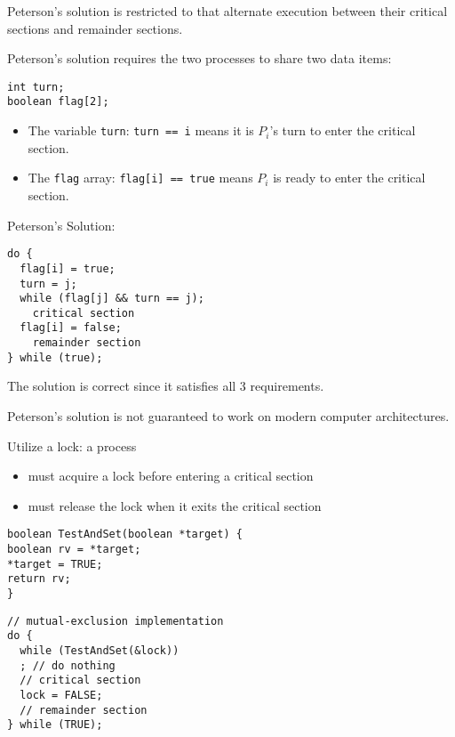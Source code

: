   \par Peterson's solution is restricted to  that alternate execution between their critical sections and remainder sections.
  \par Peterson's solution requires the two processes to share two data items:

\begin{lstlisting}
int turn;
boolean flag[2];
\end{lstlisting}

  \begin{itemize}
    \item The variable \lstinline{turn}: \lstinline{turn == i} means it is $P_i$'s turn to enter the critical section.
    \item The \lstinline{flag} array: \lstinline{flag[i] == true} means $P_i$ is ready to enter the critical section.
  \end{itemize}

  \par Peterson's Solution:

\begin{lstlisting}
do {
  flag[i] = true;
  turn = j;
  while (flag[j] && turn == j);
    critical section
  flag[i] = false;
    remainder section
} while (true);
\end{lstlisting}

  \par The solution is correct since it satisfies all 3 requirements.
  \par  Peterson's solution is not guaranteed to work on modern computer architectures.

  \par Utilize a lock: a process
  \begin{itemize}
    \item must acquire a lock before entering a critical section
    \item must release the lock when it exits the critical section
  \end{itemize}

\begin{lstlisting}
boolean TestAndSet(boolean *target) {
boolean rv = *target;
*target = TRUE;
return rv;
}
\end{lstlisting}

\begin{lstlisting}
// mutual-exclusion implementation
do {
  while (TestAndSet(&lock))
  ; // do nothing
  // critical section
  lock = FALSE;
  // remainder section
} while (TRUE);
\end{lstlisting}

